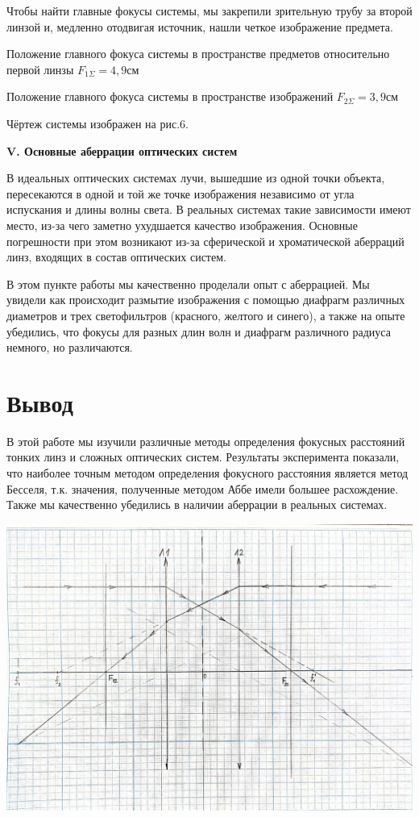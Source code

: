 \documentclass[a4paper,12pt]{report}
\begin{document}
Чтобы найти главные фокусы системы, мы закрепили зрительную трубу за второй линзой и, медленно отодвигая источник, нашли четкое изображение предмета. 

Положение главного фокуса системы в пространстве предметов относительно первой линзы $F_{1\Sigma} = 4,9 \text{см}$

Положение главного фокуса системы в пространстве изображений $F_{2\Sigma} = 3,9 \text{см}$

Чёртеж системы изображен на рис.6.

\noindent\textbf{V. Основные аберрации оптических систем}

В идеальных оптических системах лучи, вышедшие из одной точки
объекта, пересекаются в одной и той же точке изображения независимо от угла испускания и длины волны света. В реальных системах такие зависимости имеют место, из-за чего заметно ухудшается качество
изображения. Основные погрешности при этом возникают из-за сферической и хроматической аберраций линз, входящих в состав оптических
систем.

В этом пункте работы мы качественно проделали опыт с аберрацией. Мы увидели как происходит размытие изображения с помощью диафрагм различных диаметров и трех светофильтров (красного, желтого и синего), а также на опыте убедились, что фокусы для разных длин волн и диафрагм различного радиуса немного, но различаются.

\section*{Вывод}

В этой работе мы изучили различные методы определения фокусных расстояний тонких линз и сложных оптических систем. Результаты эксперимента показали, что наиболее точным методом определения фокусного расстояния является метод Бесселя, т.к. значения, полученные методом Аббе имели большее расхождение. Также мы качественно убедились в наличии аберрации в реальных системах.

\begin{center}
    \includegraphics[width = \linewidth]{pic4.jpg}
\end{center}
\end{document}
